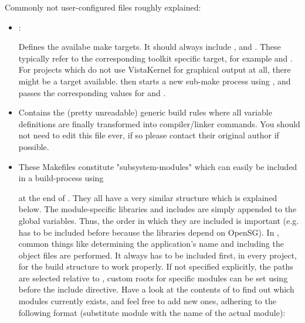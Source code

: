 Commonly not user-configured files roughly explained:
\begin{itemize}
  \item {}:

    Defines the availabe make targets. 
    It should always include ,  and . 
    These typically refer to the corresponding toolkit specific target, for example  and . 
    For projects which do not use VistaKernel for graphical output at all, there might be a  target available.
     then starts a new sub-make process using , and passes the corresponding values for  and .

  \item {}

    Contains the (pretty unreadable) generic build rules where all variable definitions are finally transformed into compiler/linker commands.
    You should not need to edit this file ever, if so please contact their original author if possible.

  \item {}

    These Makefiles constitute "subsystem-modules" which can easily be included in a build-process using 


    at the end of .    
    They all have a very similar structure which is explained below. The module-specific libraries and includes are simply appended to the global variables. 
    Thus, the order in which they are included is important (e.g.  has to be included before  because the  libraries depend on OpenSG). 
    In , common things like determining the application's name and including the object files are performed. 
    It always has to be included first, in every project, for the build structure to work properly. 
    If not specified explicitly, the paths are selected relative to , custom roots for specific modules can be set using  before the include directive.
    Have a look at the contents of  to find out which modules currently exists, and feel free to add new ones, adhering to the following format (substitute module with the name of the actual module):


\end{itemize}
